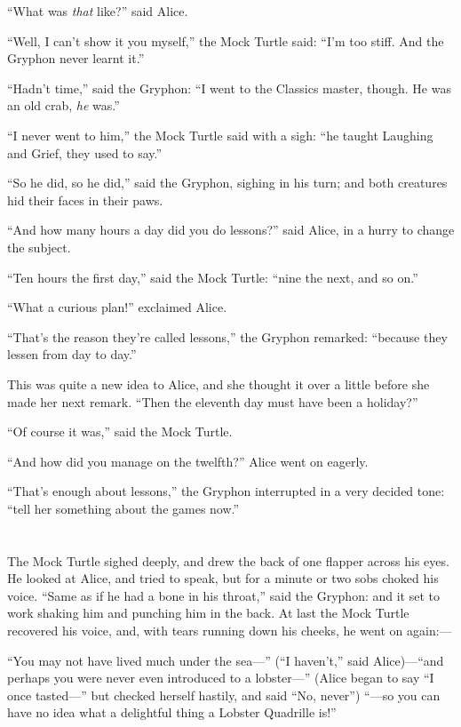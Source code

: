 \documentclass[book, 20pt]{extbook}
\begin{document}
``What was \emph{that} like?'' said Alice.

``Well, I can't show it you myself,'' the Mock Turtle said: ``I'm too
stiff. And the Gryphon never learnt it.''

``Hadn't time,'' said the Gryphon: ``I went to the Classics master,
though. He was an old crab, \emph{he} was.''

``I never went to him,'' the Mock Turtle said with a sigh: ``he taught
Laughing and Grief, they used to say.''

``So he did, so he did,'' said the Gryphon, sighing in his turn; and
both creatures hid their faces in their paws.

``And how many hours a day did you do lessons?'' said Alice, in a hurry
to change the subject.

``Ten hours the first day,'' said the Mock Turtle: ``nine the next, and
so on.''

``What a curious plan!'' exclaimed Alice.

``That's the reason they're called lessons,'' the Gryphon remarked:
``because they lessen from day to day.''

This was quite a new idea to Alice, and she thought it over a little
before she made her next remark. ``Then the eleventh day must have been
a holiday?''

``Of course it was,'' said the Mock Turtle.

``And how did you manage on the twelfth?'' Alice went on eagerly.

``That's enough about lessons,'' the Gryphon interrupted in a very
decided tone: ``tell her something about the games now.''

\chapter*{}


The Mock Turtle sighed deeply, and drew the back of one flapper across
his eyes. He looked at Alice, and tried to speak, but for a minute or
two sobs choked his voice. ``Same as if he had a bone in his throat,''
said the Gryphon: and it set to work shaking him and punching him in the
back. At last the Mock Turtle recovered his voice, and, with tears
running down his cheeks, he went on again:---

``You may not have lived much under the sea---'' (``I haven't,'' said
Alice)---``and perhaps you were never even introduced to a lobster---''
(Alice began to say ``I once tasted---'' but checked herself hastily,
and said ``No, never'') ``---so you can have no idea what a delightful
thing a Lobster Quadrille is!''
\end{document}
